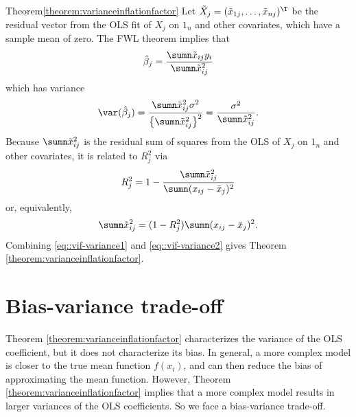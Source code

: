 \begin{myproof}{Theorem}{\ref{theorem:varianceinflationfactor}}
Let $\tilde{X}_{j} = (\tilde{x}_{1j}, \ldots, \tilde{x}_{nj})^{\T}$ be the residual vector from the OLS fit of $X_{j}$
on $1_{n}$ and other covariates, which have a sample mean of zero. The FWL
theorem implies that 
\[
\hat{\beta}_{j}=\frac{\sumn\tilde{x}_{ij}y_{i}}{\sumn\tilde{x}_{ij}^{2}}
\]
which has variance
\begin{equation}\label{eq::vif-variance1}
\var(\hat{\beta}_{j})=\frac{\sumn\tilde{x}_{ij}^{2}\sigma^{2}}{\left\{ \sumn\tilde{x}_{ij}^{2}\right\} ^{2}}=\frac{\sigma^{2}}{\sumn\tilde{x}_{ij}^{2}}.
\end{equation}
Because $\sumn\tilde{x}_{ij}^{2}$ is the residual sum of squares
from the OLS of $X_{j}$ on $1_{n}$ and other covariates, it is
related to $R_{j}^{2}$ via
\[
R_{j}^{2}=1-\frac{\sumn\tilde{x}_{ij}^{2}}{\sumn(x_{ij}-\bar{x}_{j})^{2}}
\]
or, equivalently,
\begin{equation}\label{eq::vif-variance2}
\sumn\tilde{x}_{ij}^{2}=(1-R_{j}^{2})\sumn(x_{ij}-\bar{x}_{j})^{2}.
\end{equation}
Combining \eqref{eq::vif-variance1} and \eqref{eq::vif-variance2} gives Theorem \ref{theorem:varianceinflationfactor}. 
\end{myproof}





\section{Bias-variance trade-off}

Theorem \ref{theorem:varianceinflationfactor} characterizes the variance
of the OLS coefficient, but it does not characterize its bias. In
general,   a more complex model is closer to
the true mean function $f(x_i)$, and can then reduce the bias of approximating the mean function.
However, Theorem \ref{theorem:varianceinflationfactor} implies that a more complex model results in larger variances of the OLS
coefficients. So we face a bias-variance trade-off. 



